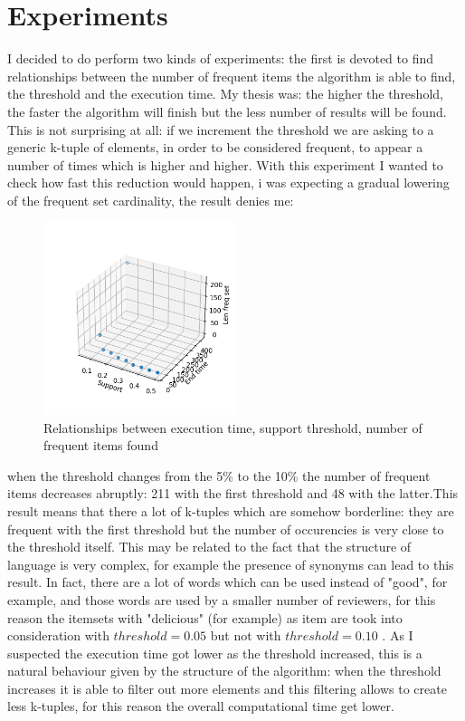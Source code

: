\section{Experiments}

I decided to do perform two kinds of experiments: the first is devoted to find relationships between the number of frequent items the algorithm is able to find, the threshold and the execution time. My thesis was: the higher the threshold, the faster the algorithm will finish but the less number of results will be found. This is not surprising at all: if we increment the threshold we are asking to a generic k-tuple of elements, in order to be considered frequent, to appear a number of times which is higher and higher. With this experiment I wanted to check how fast this reduction would happen, i was expecting a gradual lowering of the frequent set cardinality, the result denies me:
\begin{figure}[h]
    \caption{Relationships between execution time, support threshold, number of frequent items found}
    \centering
    \includegraphics[width=0.5\textwidth]{project_report_src/project_report_images/support_end-time_len-freq-set.png}
\end{figure}

when the threshold changes from the 5\% to the 10\% the number of frequent items decreases abruptly: 211 with the first threshold and 48 with the latter.This result means that there a lot of k-tuples which are somehow borderline: they are frequent with the first threshold but the number of occurencies is very close to the threshold itself. This may be related to the fact that the structure of language is very complex, for example the presence of synonyms can lead to this result. In fact, there are a lot of words which can be used instead of "good", for example, and those words are used by a smaller number of reviewers, for this reason the itemsets with "delicious" (for example) as item are took into consideration with $threshold = 0.05$ but not with $threshold = 0.10$ . As I suspected the execution time got lower as the threshold increased, this is a natural behaviour given by the structure of the algorithm: when the threshold increases it is able to filter out more elements and this filtering allows to create less k-tuples, for this reason the overall computational time get lower.

